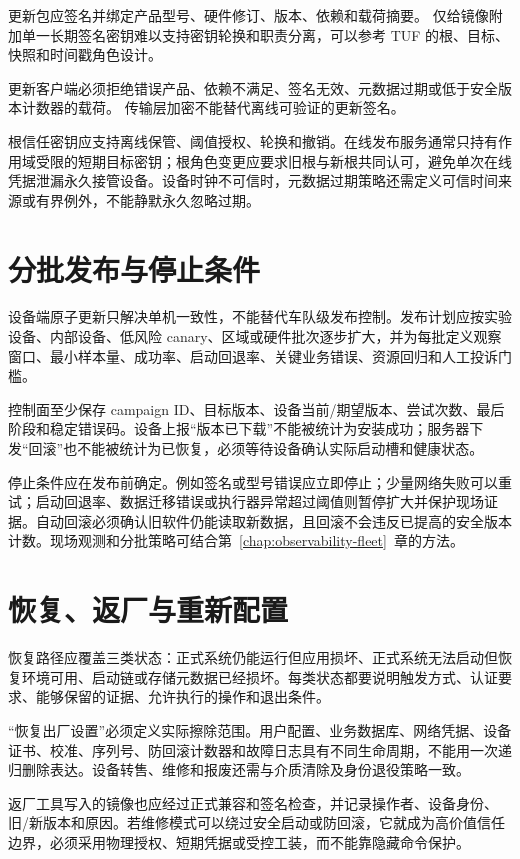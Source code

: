 更新包应签名并绑定产品型号、硬件修订、版本、依赖和载荷摘要。
仅给镜像附加单一长期签名密钥难以支持密钥轮换和职责分离，可以参考 TUF 的根、目标、快照和时间戳角色设计\cite{tuf-spec}。

更新客户端必须拒绝错误产品、依赖不满足、签名无效、元数据过期或低于安全版本计数器的载荷。
传输层加密不能替代离线可验证的更新签名。

根信任密钥应支持离线保管、阈值授权、轮换和撤销。在线发布服务通常只持有作用域受限的短期目标密钥；根角色变更应要求旧根与新根共同认可，避免单次在线凭据泄漏永久接管设备。设备时钟不可信时，元数据过期策略还需定义可信时间来源或有界例外，不能静默永久忽略过期。

\section{分批发布与停止条件}

设备端原子更新只解决单机一致性，不能替代车队级发布控制。发布计划应按实验设备、内部设备、低风险 canary、区域或硬件批次逐步扩大，并为每批定义观察窗口、最小样本量、成功率、启动回退率、关键业务错误、资源回归和人工投诉门槛。

控制面至少保存 campaign ID、目标版本、设备当前/期望版本、尝试次数、最后阶段和稳定错误码。设备上报“版本已下载”不能被统计为安装成功；服务器下发“回滚”也不能被统计为已恢复，必须等待设备确认实际启动槽和健康状态。

停止条件应在发布前确定。例如签名或型号错误应立即停止；少量网络失败可以重试；启动回退率、数据迁移错误或执行器异常超过阈值则暂停扩大并保护现场证据。自动回滚必须确认旧软件仍能读取新数据，且回滚不会违反已提高的安全版本计数。现场观测和分批策略可结合第~\ref{chap:observability-fleet}~章的方法。

\section{恢复、返厂与重新配置}

恢复路径应覆盖三类状态：正式系统仍能运行但应用损坏、正式系统无法启动但恢复环境可用、启动链或存储元数据已经损坏。每类状态都要说明触发方式、认证要求、能够保留的证据、允许执行的操作和退出条件。

“恢复出厂设置”必须定义实际擦除范围。用户配置、业务数据库、网络凭据、设备证书、校准、序列号、防回滚计数器和故障日志具有不同生命周期，不能用一次递归删除表达。设备转售、维修和报废还需与介质清除及身份退役策略一致。

返厂工具写入的镜像也应经过正式兼容和签名检查，并记录操作者、设备身份、旧/新版本和原因。若维修模式可以绕过安全启动或防回滚，它就成为高价值信任边界，必须采用物理授权、短期凭据或受控工装，而不能靠隐藏命令保护。

